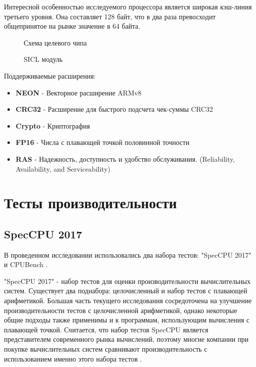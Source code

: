 Интересной особенностью исследуемого процессора является широкая кэш-линия третьего уровня. Она составляет 128 байт, что в два раза превосходит общепринятое на рынке значение в 64 байта. 

\begin{figure}[htbp]
	\centering
	
	\caption{Схема целевого чипа}
	\label{chip1}
\end{figure}
\begin{figure}[htbp]
	\centering
	
	\caption{SICL модуль}
	\label{chip2}
\end{figure}

Поддерживаемые расширения:
\begin{itemize}
	\item  \textbf{NEON} - Векторное расширение ARMv8
	\item  \textbf{CRC32} - Расширение для быстрого подсчета чек-суммы CRC32
	\item  \textbf{Crypto} - Криптография
	\item  \textbf{FP16} - Числа с плавающей точкой половинной точности
	\item  \textbf{RAS} -  Надежность, доступность и удобство обслуживания. (Reliability, Availability, and Serviceability)
\end{itemize}

\section{Тесты производительности}\label{p1:tests}
\subsection{SpecCPU 2017}\label{p1:tests:spec}
В проведенном исследовании использовались два набора тестов: "SpecCPU 2017"\phantom{ } \cite{bucek2018spec} и CPUBench \cite{lu2023cpubench}. 

"SpecCPU 2017"\phantom{} - набор тестов для оценки производительности вычислительных систем. Существует два поднабора: целочисленный и набор тестов с плавающей арифметикой. Большая часть текущего исследования сосредоточена на улучшение производительности тестов с целочисленной арифметикой, однако некоторые общие подходы также применимы и к программам, использующим вычисления с плавающей точкой. Считается, что набор тестов SpecCPU является представителем современного рынка вычислений, поэтому многие компании при покупке вычислительных систем сравнивают производительность с использованием именно этого набора тестов \cite{bucek2018spec}.

